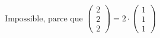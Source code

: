\documentclass{article}
\begin{document}
\[ \text{Impossible, parce que } \begin{pmatrix} 2 \\ 2 \\ 2 \end{pmatrix} = 2 \cdot \begin{pmatrix} 1 \\ 1 \\ 1 \end{pmatrix} \]
\end{document}
